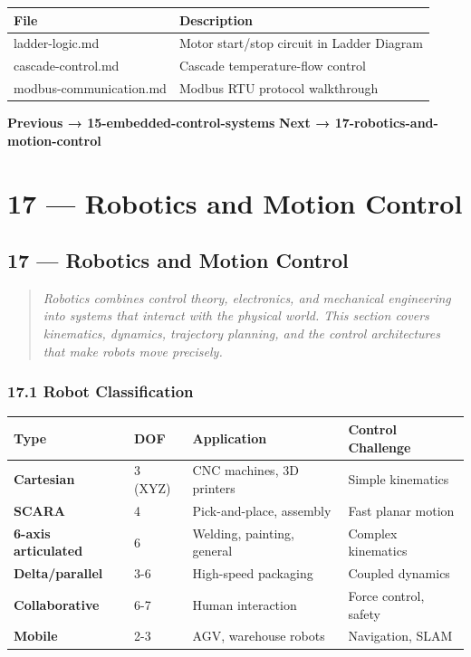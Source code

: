 \documentclass[11pt,a4paper]{book}
\begin{document}
\begin{itemize}
\begin{center}
\begin{tabular}{|l|l|}
\hline
File & Description \\
\hline
ladder-logic.md & Motor start/stop circuit in Ladder Diagram \\
cascade-control.md & Cascade temperature-flow control \\
modbus-communication.md & Modbus RTU protocol walkthrough \\
\hline
\end{tabular}
\end{center}

\medskip\noindent\hrulefill\medskip

\textbf{Previous → 15-embedded-control-systems}  
\textbf{Next → 17-robotics-and-motion-control}


\chapter{17 — Robotics and Motion Control}
\section{17 — Robotics and Motion Control}

\begin{quote}
\textit{Robotics combines control theory, electronics, and mechanical engineering into systems that interact with the physical world. This section covers kinematics, dynamics, trajectory planning, and the control architectures that make robots move precisely.}
\end{quote}

\medskip\noindent\hrulefill\medskip

\subsection{17.1 Robot Classification}

\begin{center}
\begin{tabular}{|l|l|l|l|}
\hline
Type & DOF & Application & Control Challenge \\
\hline
\textbf{Cartesian} & 3 (XYZ) & CNC machines, 3D printers & Simple kinematics \\
\textbf{SCARA} & 4 & Pick-and-place, assembly & Fast planar motion \\
\textbf{6-axis articulated} & 6 & Welding, painting, general & Complex kinematics \\
\textbf{Delta/parallel} & 3-6 & High-speed packaging & Coupled dynamics \\
\textbf{Collaborative} & 6-7 & Human interaction & Force control, safety \\
\textbf{Mobile} & 2-3 & AGV, warehouse robots & Navigation, SLAM \\
\hline
\end{tabular}
\end{center}


\end{itemize}
\end{document}
